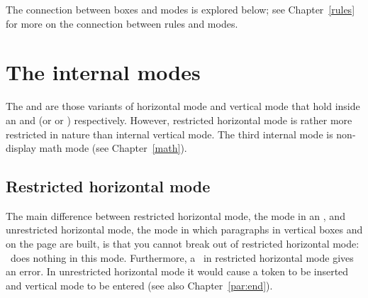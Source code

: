 \documentclass{book}
\begin{document}
The connection between boxes and modes is explored below;
see Chapter~\ref{rules} for more on the connection between
rules and modes.

\section{The internal modes}

The  and 
are those variants of horizontal mode and vertical mode
that hold inside an  and  (or 
or ) respectively.
However, restricted horizontal mode is rather more
restricted in nature than internal vertical mode.
The third internal mode is non-display math mode
(see Chapter~\ref{math}).

\subsection{Restricted horizontal mode}

The main difference between restricted horizontal mode,
the mode in an , and unrestricted horizontal mode,
the mode in which paragraphs in vertical boxes
and on the page are built,
is that you cannot break out of restricted horizontal mode: 
~does nothing in this mode. 
Furthermore, a~ in restricted horizontal
mode gives an error. 
In unrestricted horizontal mode it would cause a
 token to be inserted and vertical mode to be entered
(see also Chapter~\ref{par:end}).
\end{document}
